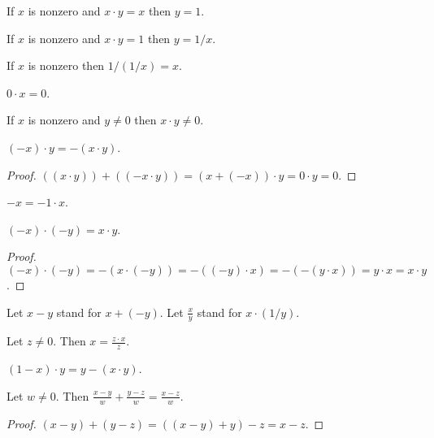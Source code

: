\documentclass{article}
\begin{document}
\begin{forthel}
\begin{proposition}[1 15 b]
If $x$ is nonzero and $x \cdot y = x$ then $y = 1$.
\end{proposition}

\begin{proposition}[1 15 c]
If $x$ is nonzero and $x \cdot y = 1$ then $y = 1/x$.
\end{proposition}

\begin{proposition}[1 15 d]
If $x$ is nonzero then $1/(1/x) = x$.
\end{proposition}

\begin{proposition}[1 16 a]
$0 \cdot x = 0$.
\end{proposition}

\begin{proposition}[1 16 b]
If $x$ is nonzero and $y \neq 0$ then $x \cdot y \neq 0$.
\end{proposition}

\begin{proposition}[1 16 c]
$(-x) \cdot y = -(x \cdot y)$.
\end{proposition}
\begin{proof}
$((x \cdot y)) + ((-x \cdot y)) = (x + (-x)) \cdot y
= 0 \cdot y = 0$.
\end{proof}

\begin{proposition}
$-x = -1 \cdot x$.
\end{proposition}

\begin{proposition}[1 16d]
$(-x) \cdot (-y) = x \cdot y$.
\end{proposition}
\begin{proof}
$(-x)\cdot (-y) = -(x\cdot(-y)) = -((-y)\cdot x) =
-(-(y\cdot x)) = y\cdot x = x\cdot y$.
\end{proof}

Let $x - y$ stand for $x + (-y)$.
Let $\frac{x}{y}$ stand for $x \cdot (1/y)$.

\begin{lemma} Let $z \neq 0$. Then
$x = \frac{z \cdot x}{z}$.
\end{lemma}

\begin{lemma}
$(1 - x) \cdot y = y - (x \cdot y)$.
\end{lemma}

\begin{lemma} Let $w \neq 0$. Then
$\frac{x - y}{w} + \frac{y - z}{w} = \frac{x - z}{w}$.
\end{lemma}
\begin{proof}
$(x - y) + (y - z) = ((x - y) + y) - z = x - z$.
\end{proof}

\end{forthel}
\end{document}
